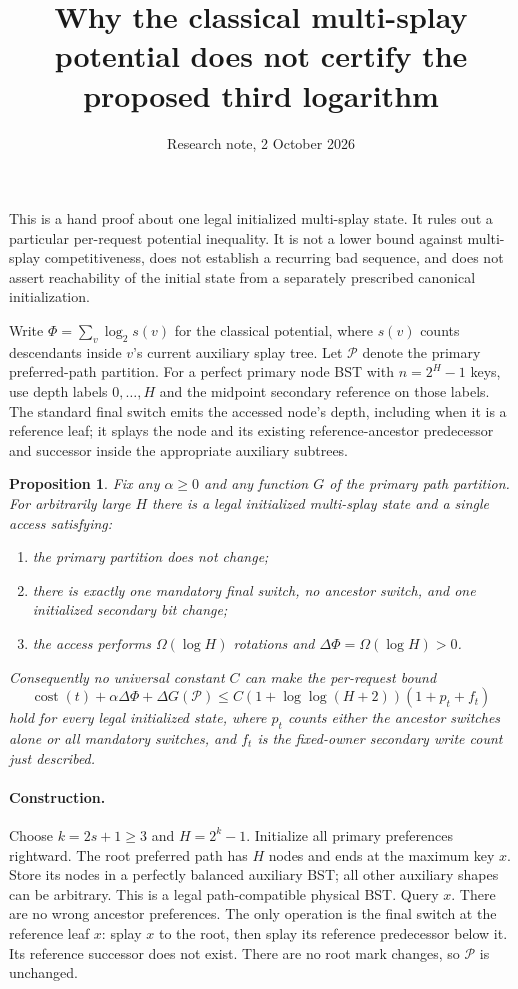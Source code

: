 \documentclass[11pt]{article}
\title{Why the classical multi-splay potential does not certify the proposed third logarithm}
\author{Research note, 2 October 2026}
\date{}
\newtheorem{proposition}{Proposition}
\begin{document}
\maketitle

This is a hand proof about one legal initialized multi-splay state. It
rules out a particular per-request potential inequality. It is not a
lower bound against multi-splay competitiveness, does not establish a
recurring bad sequence, and does not assert reachability of the initial
state from a separately prescribed canonical initialization.

Write $\Phi=\sum_v\log_2 s(v)$ for the classical potential, where
$s(v)$ counts descendants inside $v$'s current auxiliary splay tree.
Let $\mathcal P$ denote the primary preferred-path partition. For a
perfect primary node BST with $n=2^H-1$ keys, use depth labels
$0,\ldots,H$ and the midpoint secondary reference on those labels.
The standard final switch emits the accessed node's depth, including
when it is a reference leaf; it splays the node and its existing
reference-ancestor predecessor and successor inside the appropriate
auxiliary subtrees.

\begin{proposition}\label{prop:failure}
Fix any $\alpha\ge0$ and any function $G$ of the primary path partition.
For arbitrarily large $H$ there is a legal initialized multi-splay state
and a single access satisfying:
\begin{enumerate}
\item the primary partition does not change;
\item there is exactly one mandatory final switch, no ancestor switch,
and one initialized secondary bit change;
\item the access performs $\Omega(\log H)$ rotations and
$\Delta\Phi=\Omega(\log H)>0$.
\end{enumerate}
Consequently no universal constant $C$ can make the per-request bound
\[
 \operatorname{cost}(t)+\alpha\Delta\Phi+\Delta G(\mathcal P)
 \le C(1+\log\log(H+2))(1+p_t+f_t)
\]
hold for every legal initialized state, where $p_t$ counts either the
ancestor switches alone or all mandatory switches, and $f_t$ is the
fixed-owner secondary write count just described.
\end{proposition}

\paragraph{Construction.}
Choose $k=2s+1\ge3$ and $H=2^k-1$. Initialize all primary preferences
rightward. The root preferred path has $H$ nodes and ends at the
maximum key $x$. Store its nodes in a perfectly balanced auxiliary BST;
all other auxiliary shapes can be arbitrary. This is a legal
path-compatible physical BST. Query $x$. There are no wrong ancestor
preferences. The only operation is the final switch at the reference
leaf $x$: splay $x$ to the root, then splay its reference predecessor
below it. Its reference successor does not exist. There are no root
mark changes, so $\mathcal P$ is unchanged.
\end{document}
